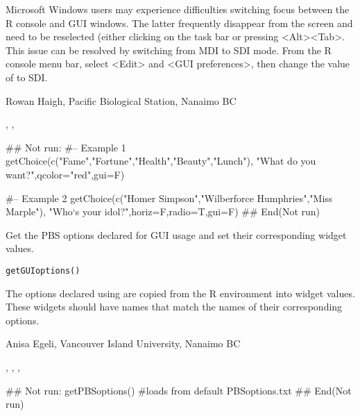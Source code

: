 \documentclass[letterpaper]{book}
\begin{document}
\begin{Note}\relax
Microsoft Windows users may experience difficulties switching focus between the 
R console and GUI windows. The latter frequently disappear from the screen and 
need to be reselected (either clicking on the task bar or pressing \textless{}Alt\textgreater{}\textless{}Tab\textgreater{}. 
This issue can be resolved by switching from MDI to SDI mode. From the R console 
menu bar, select \textless{}Edit\textgreater{} and \textless{}GUI preferences\textgreater{}, then change the value of 
 to SDI.
\end{Note}
\begin{Author}\relax
Rowan Haigh, Pacific Biological Station, Nanaimo BC
\end{Author}
\begin{SeeAlso}\relax
{}, , 
\end{SeeAlso}
\begin{Examples}
\begin{ExampleCode}
## Not run: 
#-- Example 1
getChoice(c("Fame","Fortune","Health","Beauty","Lunch"),
   "What do you want?",qcolor="red",gui=F)

#-- Example 2
getChoice(c("Homer Simpson","Wilberforce Humphries","Miss Marple"),
   "Who`s your idol?",horiz=F,radio=T,gui=F)
## End(Not run)
\end{ExampleCode}
\end{Examples}

\begin{Description}\relax
Get the PBS options declared for GUI usage and set their 
corresponding widget values.
\end{Description}
\begin{Usage}
\begin{verbatim}
getGUIoptions()
\end{verbatim}
\end{Usage}
\begin{Details}\relax
The options declared using  are 
copied from the R environment into widget values. These widgets 
should have names that match the names of their corresponding options.
\end{Details}
\begin{Author}\relax
Anisa Egeli, Vancouver Island University, Nanaimo BC
\end{Author}
\begin{SeeAlso}\relax
{}, ,
, 
\end{SeeAlso}
\begin{Examples}
\begin{ExampleCode}
## Not run: 
getPBSoptions() #loads from default PBSoptions.txt
## End(Not run)
\end{ExampleCode}
\end{Examples}
\end{document}
